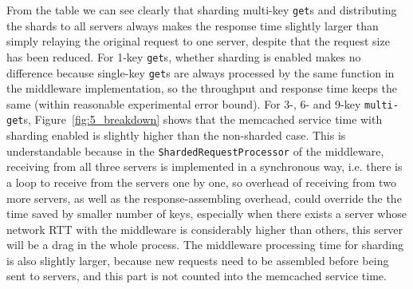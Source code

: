 \begin{table}[!ht]
\centering
{}
\end{table}


From the table we can see clearly that sharding multi-key \texttt{get}s and distributing the shards to all servers always makes the response time slightly larger than simply relaying the original request to one server, despite that the request size has been reduced. For 1-key \texttt{get}s, whether sharding is enabled makes no difference because single-key \texttt{get}s are always processed by the same function in the middleware implementation, so the throughput and response time keeps the same (within reasonable experimental error bound). For 3-, 6- and 9-key \texttt{multi-get}s, Figure~\ref{fig:5_breakdown} shows that the memcached service time with sharding enabled is slightly higher than the non-sharded case. This is understandable because in the \texttt{ShardedRequestProcessor} of the middleware, receiving from all three servers is implemented in a synchronous way, i.e. there is a loop to receive from the servers one by one, so overhead of receiving from two more servers, as well as the response-assembling overhead, could override the the time saved by smaller number of keys, especially when there exists a server whose network RTT with the middleware is considerably higher than others, this server will be a drag in the whole process. The middleware processing time for sharding is also slightly larger, because new requests need to be assembled before being sent to servers, and this part is not counted into the memcached service time.

